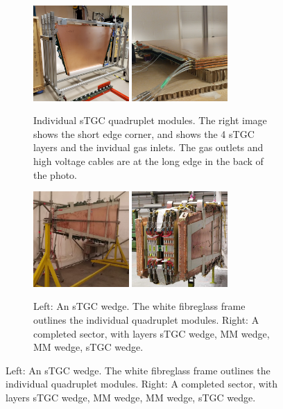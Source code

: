 \begin{figure}
\centering
\begin{subfigure}{\textwidth}
  \centering
  \includegraphics[width=0.4\textwidth]{figures/stgc_quad_cart.jpg}
  \includegraphics[width=0.4\textwidth]{figures/stgc_quad_inlet_corner.jpg}
  \caption{Individual sTGC quadruplet modules. The right image shows the short edge corner, and shows the 4 sTGC layers and the invidual gas inlets. The gas outlets and high voltage cables are at the long edge in the back of the photo.}
  \label{fig:stgc_quad}
\end{subfigure}

\medskip

\begin{subfigure}{\textwidth}
  \centering
  \includegraphics[width=0.4\textwidth]{figures/stgc_wedge.jpg}
  \includegraphics[width=0.4\textwidth]{figures/sector.jpg}
  \caption{Left: An sTGC wedge. The white fibreglass frame outlines the individual quadruplet modules. Right: A completed sector, with layers sTGC wedge, MM wedge, MM wedge, sTGC wedge.}
  \label{fig:wedge_and_sector}
\end{subfigure}


\end{figure}
